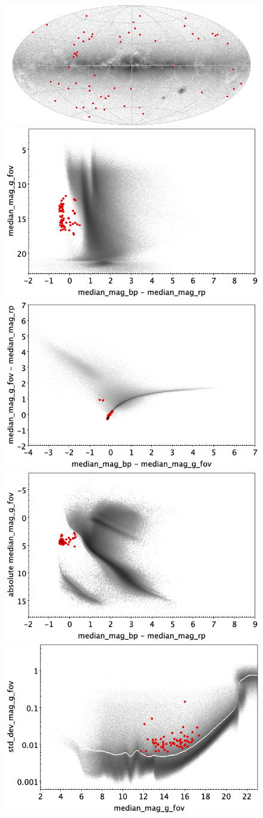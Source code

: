 \documentclass[longauth]{aa}
\begin{document}
\begin{appendix}
\begin{figure}
\centering
{} \includegraphics[width=0.6\hsize]{figures/appendix/SDB_trn_sky.png} \\ %
\vspace{4mm}
 \includegraphics[width=0.45\hsize]{figures/appendix/SDB_trn_cm.png}  %
\hspace{2mm}
 \includegraphics[width=0.45\hsize]{figures/appendix/SDB_trn_cc.png} \\ %
\vspace{4mm}
 \includegraphics[width=0.45\hsize]{figures/appendix/SDB_trn_cam.png}  %
\hspace{2mm}
 \includegraphics[width=0.45\hsize]{figures/appendix/SDB_trn_msd.png} \\ %

\end{figure}
\end{appendix}
\end{document}
